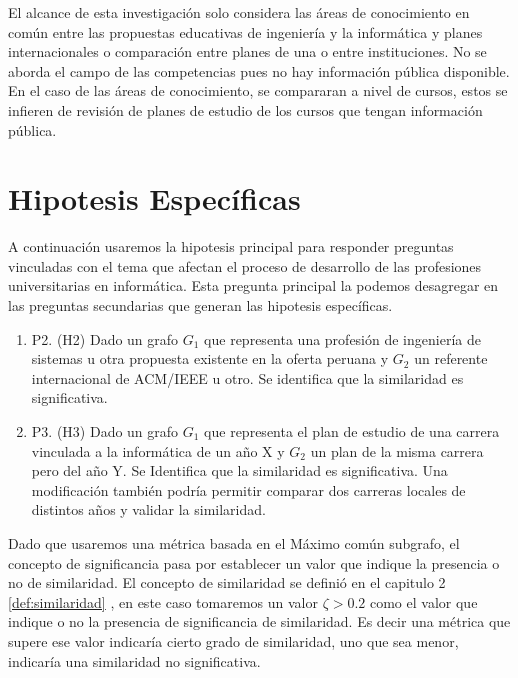 El alcance de esta investigación solo considera las áreas de conocimiento en común entre las propuestas educativas de ingeniería y la informática y planes internacionales o comparación entre planes de una o entre instituciones. No se aborda el campo de las competencias pues no hay información pública disponible. En el caso de las áreas de conocimiento, se compararan a nivel de cursos, estos se infieren de revisión de planes de estudio de los cursos que tengan información pública. 


\section{Hipotesis Específicas}

A continuación usaremos la hipotesis principal para responder preguntas vinculadas con el tema que afectan el proceso de desarrollo de las profesiones universitarias en informática. Esta pregunta principal la podemos desagregar en las preguntas secundarias que generan las hipotesis específicas.

\begin{enumerate}



	\item P2. (H2) Dado un grafo $G_1$ que representa una profesión de ingeniería de sistemas u otra propuesta existente en la oferta peruana y $G_2$ un referente internacional de ACM/IEEE u otro. Se identifica que la similaridad es significativa. 

	\item P3. (H3) Dado un grafo $G_1$ que representa el plan de estudio de una carrera vinculada a la informática de un año X y $G_2$ un plan de la misma carrera pero del año Y. Se Identifica que la similaridad es significativa. Una modificación también podría permitir comparar dos carreras locales de distintos años y validar la similaridad.


\end{enumerate}

	Dado que usaremos una métrica basada en el Máximo común subgrafo, el concepto de significancia pasa por establecer un valor que indique la presencia o no de similaridad. El concepto de similaridad se definió en el capitulo 2 \ref{def:similaridad} , en este caso tomaremos un valor $ \zeta > 0.2 $ como el valor que indique o no la presencia de significancia de similaridad. Es decir una métrica que supere ese valor indicaría cierto grado de similaridad, uno que sea menor, indicaría una similaridad no significativa.

